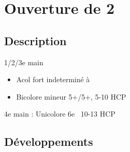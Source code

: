 \documentclass[a4paper]{article}
\begin{document}
\section{Ouverture de 2\pdfs}

\subsection{Description}

1/2/3e main

\begin{itemize}
\item Acol fort indeterminé à \s\ 

\item Bicolore mineur 5+/5+, 5-10 HCP

\end{itemize}

\begin{bidtable}
4e \> main : Unicolore 6e \s\ 10-13 HCP
\end{bidtable}

\subsection{Développements}
\end{document}
